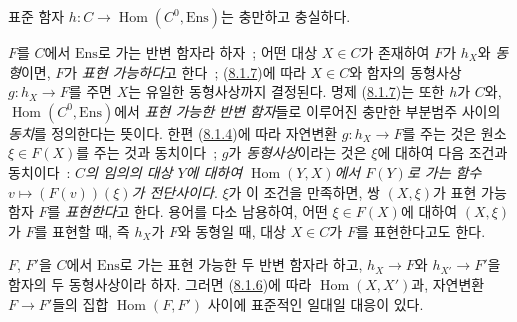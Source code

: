 \begin{proposition}[8.1.7]
\label{0.8.1.7-fr}
표준 함자 $h:C\to\operatorname{Hom}(C^0,\mathrm{Ens})$는 충만하고
충실하다.
\end{proposition}

\begin{env}[8.1.8]
\label{0.8.1.8-fr}
$F$를 $C$에서 $\mathrm{Ens}$로 가는 반변 함자라 하자~; 어떤 대상
$X\in C$가 존재하여 $F$가 $h_X$와 \emph{동형}이면, $F$가
\emph{표현 가능하다}고 한다~; (\hyperref[0.8.1.7-fr]{8.1.7})에 따라
$X\in C$와 함자의 동형사상 $g:h_X\to F$를 주면 $X$는 유일한
동형사상까지 결정된다. 명제 (\hyperref[0.8.1.7-fr]{8.1.7})는 또한
$h$가 $C$와, $\operatorname{Hom}(C^0,\mathrm{Ens})$에서 \emph{표현 가능한
반변 함자}들로 이루어진 충만한 부분범주 사이의 \emph{동치}를
정의한다는 뜻이다. 한편 (\hyperref[0.8.1.4-fr]{8.1.4})에 따라
자연변환 $g:h_X\to F$를 주는 것은 원소 $\xi\in F(X)$를 주는 것과
동치이다~; $g$가 \emph{동형사상}이라는 것은 $\xi$에 대하여 다음
조건과 동치이다~: \emph{$C$의 임의의 대상 $Y$에 대하여
$\operatorname{Hom}(Y,X)$에서 $F(Y)$로 가는 함수
$v\mapsto(F(v))(\xi)$가 전단사이다}. $\xi$가 이 조건을 만족하면,
쌍 $(X,\xi)$가 표현 가능 함자 $F$를 \emph{표현한다}고 한다. 용어를
다소 남용하여, 어떤 $\xi\in F(X)$에 대하여 $(X,\xi)$가 $F$를
표현할 때, 즉 $h_X$가 $F$와 동형일 때, 대상 $X\in C$가 $F$를
표현한다고도 한다.

$F$, $F'$을 $C$에서 $\mathrm{Ens}$로 가는 표현 가능한 두 반변
함자라 하고, $h_X\to F$와 $h_{X'}\to F'$을 함자의 두 동형사상이라
하자. 그러면 (\hyperref[0.8.1.6-fr]{8.1.6})에 따라
$\operatorname{Hom}(X,X')$과, 자연변환 $F\to F'$들의 집합
$\operatorname{Hom}(F,F')$ 사이에 표준적인 일대일 대응이 있다.
\end{env}

